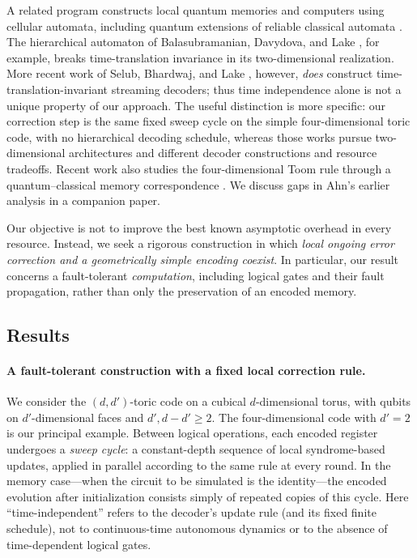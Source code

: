 A related program constructs local quantum memories and computers using cellular automata, including quantum extensions of reliable classical automata \cite{dünnweber2026quantummemoryautonomouscomputation}.  The hierarchical automaton of Balasubramanian, Davydova, and Lake \cite{Balasubramanian_2026}, for example, breaks time-translation invariance in its two-dimensional realization.  More recent work of Selub, Bhardwaj, and Lake \cite{SelubBhardwajLake2026}, however, \emph{does} construct time-translation-invariant streaming decoders; thus time independence alone is not a unique property of our approach.  The useful distinction is more specific: our correction step is the same fixed sweep cycle on the simple four-dimensional toric code, with no hierarchical decoding schedule, whereas those works pursue two-dimensional architectures and different decoder constructions and resource tradeoffs.  Recent work also studies the four-dimensional Toom rule through a quantum--classical memory correspondence \cite{DrechslerOregAharonov2026}.  We discuss gaps in Ahn's earlier analysis \cite{Ahn2004} in a companion paper.

Our objective is not to improve the best known asymptotic overhead in every resource.  Instead, we seek a rigorous construction in which \emph{local ongoing error correction and a geometrically simple encoding coexist}.  In particular, our result concerns a fault-tolerant \emph{computation}, including logical gates and their fault propagation, rather than only the preservation of an encoded memory.

\subsection{Results}

\paragraph{A fault-tolerant construction with a fixed local correction rule.}
We consider the $(d,d')$-toric code on a cubical $d$-dimensional torus, with qubits on $d'$-dimensional faces and $d',d-d'\geq 2$.  The four-dimensional code with $d'=2$ is our principal example.  Between logical operations, each encoded register undergoes a \emph{sweep cycle}: a constant-depth sequence of local syndrome-based updates, applied in parallel according to the same rule at every round.  In the memory case---when the circuit to be simulated is the identity---the encoded evolution after initialization consists simply of repeated copies of this cycle.  Here ``time-independent'' refers to the decoder's update rule (and its fixed finite schedule), not to continuous-time autonomous dynamics or to the absence of time-dependent logical gates.

